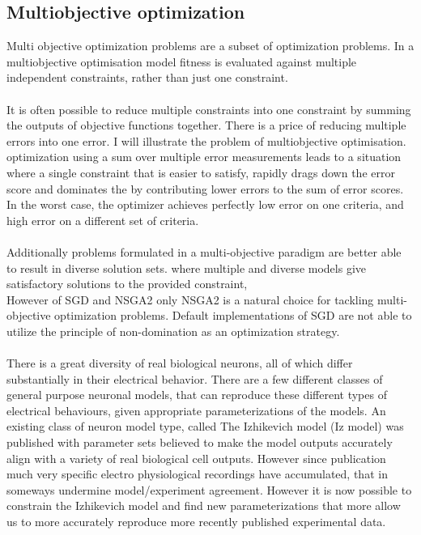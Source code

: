 \subsection{Multiobjective optimization} Multi objective optimization problems are a subset of optimization problems. In a multiobjective optimisation model fitness is evaluated against multiple independent constraints, rather than just one constraint. \\
\\
It is often possible to reduce multiple constraints into one constraint by summing the outputs of objective functions together. There is a price of reducing multiple errors into one error. I will illustrate the problem of multiobjective optimisation. optimization using a sum over multiple error measurements leads to a situation where a single constraint that is easier to satisfy, rapidly drags down the error score and dominates the by contributing lower errors to the sum of error scores. In the worst case, the optimizer achieves perfectly low error on one criteria, and high error on a different set of criteria.\\
\\
Additionally problems formulated in a multi-objective paradigm are better able to result in diverse solution sets. where multiple and diverse models give satisfactory solutions to the provided constraint, 
\\
However of SGD and NSGA2 only NSGA2 is a natural choice for tackling multi-objective optimization problems. Default implementations of SGD are not able to utilize the principle of non-domination as an optimization strategy.\\
\\
There is a great diversity of real biological neurons, all of which differ substantially in their electrical behavior. There are a few different classes of general purpose neuronal models, that can reproduce these different types of electrical behaviours, given appropriate parameterizations of the models.\newline
\newline
An existing class of neuron model type, called The Izhikevich model \cite{izhikevich2003simple} (Iz model) was published with parameter sets believed to make the model outputs accurately align with a variety of real biological cell outputs. However since publication much very specific electro physiological recordings have accumulated, that in someways undermine model/experiment agreement. However it is now possible to constrain the Izhikevich model and find new parameterizations that more allow us to more accurately reproduce more recently published experimental data.\newline
\newline


